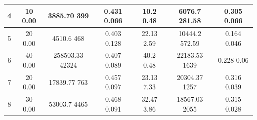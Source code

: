 \begin{table}[h]
{\begin{tabular}{|c|c|c|c|c|c|c|}
4                & 10 \rlap{{$\pm$}}\hspace{0.4cm} 0.00              & 3885.70 \rlap{{$\pm$}}\hspace{0.4cm}399 \rlap{{$\downarrow$}}          & 0.431 \rlap{{$\pm$}}\hspace{0.4cm}0.066 \rlap{{$\uparrow$}}       & 10.2 \rlap{{$\pm$}}\hspace{0.4cm}0.48       & 6076.7 \rlap{{$\pm$}}\hspace{0.4cm}281.58      & 0.305 \rlap{{$\pm$}}\hspace{0.4cm}0.066            \\ \hline
5                & 20 \rlap{{$\pm$}}\hspace{0.4cm} 0.00             & 4510.6 \rlap{{$\pm$}}\hspace{0.4cm}468 \rlap{{$\downarrow$}}           & 0.403 \rlap{{$\pm$}}\hspace{0.4cm}0.128\rlap{{$\uparrow$}}        & 22.13 \rlap{{$\pm$}}\hspace{0.4cm}2.59      & 10444.2 \rlap{{$\pm$}}\hspace{0.4cm}572.59     & 0.164 \rlap{{$\pm$}}\hspace{0.4cm}0.046            \\ \hline
6                & 40 \rlap{{$\pm$}}\hspace{0.4cm} 0.00              & 258503.33 \rlap{{$\pm$}}\hspace{0.4cm}42324 \rlap{{$\uparrow$}}       & 0.407 \rlap{{$\pm$}}\hspace{0.4cm}0.089 \rlap{{$\uparrow$}}       & 40.2 \rlap{{$\pm$}}\hspace{0.4cm}0.48       & 22183.53 \rlap{{$\pm$}}\hspace{0.4cm}1639      & 0.228 \rlap{{$\pm$}}\hspace{0.4cm}0.06           \\ \hline
7                & 20 \rlap{{$\pm$}}\hspace{0.4cm} 0.00              & 17839.77 \rlap{{$\pm$}}\hspace{0.4cm}763 \rlap{{$\downarrow$}}          & 0.457 \rlap{{$\pm$}}\hspace{0.4cm}0.097 \rlap{{$\uparrow$}}       & 23.13 \rlap{{$\pm$}}\hspace{0.4cm}7.33      & 20304.37 \rlap{{$\pm$}}\hspace{0.4cm}1257      & 0.316 \rlap{{$\pm$}}\hspace{0.4cm}0.039          \\ \hline
8                & 30 \rlap{{$\pm$}}\hspace{0.4cm} 0.00              & 53003.7 \rlap{{$\pm$}}\hspace{0.4cm}4465 \rlap{{$\uparrow$}}          & 0.468 \rlap{{$\pm$}}\hspace{0.4cm}0.091 \rlap{{$\uparrow$}}       & 32.47 \rlap{{$\pm$}}\hspace{0.4cm}3.86      & 18567.03 \rlap{{$\pm$}}\hspace{0.4cm}2055      & 0.315 \rlap{{$\pm$}}\hspace{0.4cm}0.028                \\ \hline

\end{tabular}}
\end{table}
